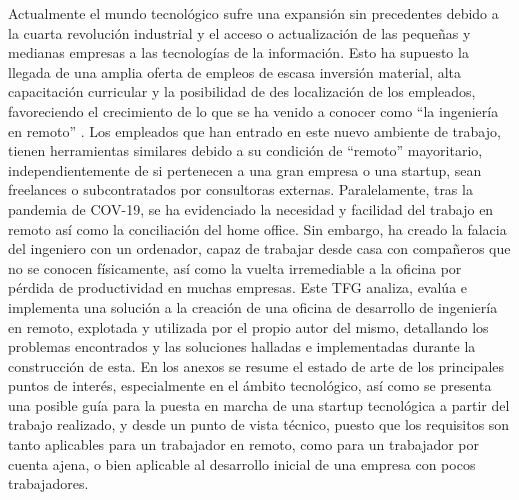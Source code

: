 \documentclass[spanish,final]{setup/eetac_tfc_pfc}
\begin{document}

\beforepreface  


\begin{resum}{10cm}
Actualmente el mundo tecnológico sufre una expansión sin precedentes debido a la cuarta revolución industrial\cite{c_revolucion_4_0} y el acceso o actualización de las pequeñas y medianas empresas a las tecnologías de la información\cite{c_pyme_digital}. Esto ha supuesto la llegada de una amplia oferta de empleos de escasa inversión material, alta capacitación curricular y la posibilidad de des localización de los empleados, favoreciendo el crecimiento de lo que se ha venido a conocer como “la ingeniería en remoto”\cite{c_remote_work_stat_uk} \cite{c_remote_work_stat_talent}. Los empleados que han entrado en este nuevo  ambiente de trabajo, tienen herramientas similares debido a su condición de “remoto” mayoritario, independientemente de si pertenecen a una gran empresa o una startup, sean freelances o subcontratados por consultoras externas.\newline
\newline
Paralelamente, tras la pandemia de COV-19\cite{c_covid_remote}, se ha evidenciado la necesidad y facilidad del trabajo en remoto así como la conciliación del home office. Sin embargo, ha creado la falacia del ingeniero con un ordenador, capaz de trabajar desde casa con compañeros que no se conocen físicamente, así como la vuelta irremediable a la oficina por pérdida de productividad en muchas empresas\cite{c_back_office}.\newline
\newline
Este TFG  analiza, evalúa e implementa una solución a la creación de una oficina de desarrollo de ingeniería en remoto, explotada y utilizada por el propio autor del mismo, detallando los problemas encontrados y las soluciones halladas e implementadas durante la construcción de esta. \newline
\newline
En los anexos se resume el estado de arte de los principales puntos de interés, especialmente en el ámbito tecnológico, así como se presenta una posible guía para la puesta en marcha de una startup tecnológica a partir del trabajo realizado, y desde un punto de vista técnico, puesto que los requisitos son tanto aplicables para un trabajador en remoto, como para un trabajador por cuenta ajena, o bien aplicable al desarrollo inicial de una empresa con pocos trabajadores.\newline

\end{resum}
\end{document}
